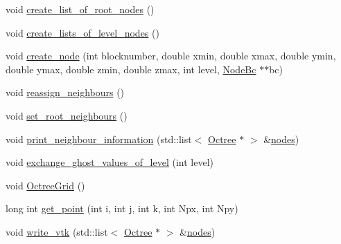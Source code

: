 \begin{DoxyCompactItemize}
void \hyperlink{namespacemy_octree_aaa20834da8b824542110b0b03aa35359}{create\+\_\+list\+\_\+of\+\_\+root\+\_\+nodes} ()
\item 
void \hyperlink{namespacemy_octree_a298dd53ebf92898b6507bb402b68fa07}{create\+\_\+lists\+\_\+of\+\_\+level\+\_\+nodes} ()
\item 
void \hyperlink{namespacemy_octree_ad83ad922f43753112c387fea916b4576}{create\+\_\+node} (int blocknumber, double xmin, double xmax, double ymin, double ymax, double zmin, double zmax, int level, \hyperlink{namespacemy_octree_adc4c8dcd84e804f57592145c650dd017}{Node\+Bc} $\ast$$\ast$bc)
\item 
void \hyperlink{namespacemy_octree_a2b0ced04fb2f16712e308eabc8ec0ba4}{reassign\+\_\+neighbours} ()
\item 
void \hyperlink{namespacemy_octree_a136efe297bcd6329e454b688cc1de442}{set\+\_\+root\+\_\+neighbours} ()
\item 
void \hyperlink{namespacemy_octree_a8766e92a2a94903f9c1ad0f7f09dbed1}{print\+\_\+neighbour\+\_\+information} (std\+::list$<$ \hyperlink{classmy_octree_1_1_octree}{Octree} $\ast$ $>$ \&\hyperlink{namespacemy_octree_a8c21e6b5a77ff973d7422aeb09230f2d}{nodes})
\item 
void \hyperlink{namespacemy_octree_ad0e2bc9828ff6443f10738e3fadf0bc3}{exchange\+\_\+ghost\+\_\+values\+\_\+of\+\_\+level} (int level)
\item 
void \hyperlink{namespacemy_octree_a182d6571bcd6fdebcdb32e5995ee3302}{Octree\+Grid} ()
\item 
long int \hyperlink{namespacemy_octree_a692cc415754017b2893dda65cd885cb6}{get\+\_\+point} (int i, int j, int k, int Npx, int Npy)
\item 
void \hyperlink{namespacemy_octree_a18a56272e19c30b632f20e549882c2e1}{write\+\_\+vtk} (std\+::list$<$ \hyperlink{classmy_octree_1_1_octree}{Octree} $\ast$ $>$ \&\hyperlink{namespacemy_octree_a8c21e6b5a77ff973d7422aeb09230f2d}{nodes})
\end{DoxyCompactItemize}
